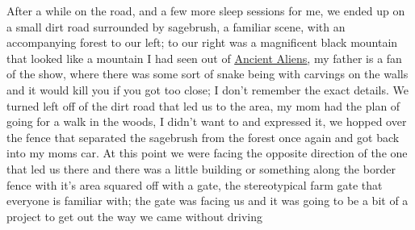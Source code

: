 \documentclass[12pt]{article}
\begin{document}
After a while on the road, and a few more sleep sessions for me, we ended up on
a small dirt road surrounded by sagebrush, a familiar scene, with an
accompanying forest to our left; to our right was a magnificent black mountain
that looked like a mountain I had seen out of
{\color{blue}\underline{\href{https://www.history.com/shows/ancient-aliens}
{Ancient Aliens}}}, my father is a fan of the show, where there was some sort
of snake being with carvings on the walls and it would kill you if you got too
close; I don't remember the exact details. We turned left off of the dirt road
that led us to the area, my mom had the plan of going for a walk in the woods,
I didn't want to and expressed it, we hopped over the fence that separated the
sagebrush from the forest once again and got back into my moms car. At this
point we were facing the opposite direction of the one that led us there and
there was a little building or something along the border fence with it's area
squared off with a gate, the stereotypical farm gate that everyone is familiar
with; the gate was facing us and it was going to be a bit of a project to get
out the way we came without driving 
\end{document}
